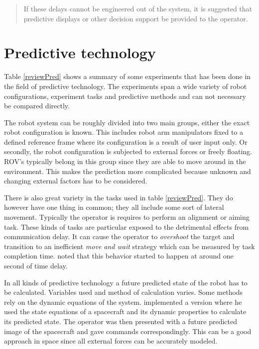 \begin{quote}
\small If these delays cannot be engineered out of the system, it is suggested that predictive displays or other decision support be provided to the operator.
\end{quote}


\section{Predictive technology}



Table \ref{reviewPred} shows a summary of some experiments that has been done in the field of predictive technology. The experiments span a wide variety of robot configurations, experiment tasks and predictive methods and can not necessary be compared directly.


The robot system can be roughly divided into two main groups, either the exact robot configuration is known. This includes robot arm manipulators fixed to a defined reference frame where its configuration is a result of user input only. Or secondly, the robot configuration is subjected to external forces or freely floating. ROV's typically belong in this group since they are able to move around in the environment. This makes the prediction more complicated because unknown and changing external factors has to be considered.

There is also great variety in the tasks used in table \ref{reviewPred}. They do however have one thing in common; they all include some sort of lateral movement. Typically the operator is requires to perform an alignment or aiming task. These kinds of tasks are particular exposed to the detrimental effects from communication delay. It can cause the operator to \emph{overshoot} the target and transition to an inefficient \emph{move and wait} strategy which can be measured by task completion time. \citet{Lane2002} noted that this behavior started to happen at around one second of time delay.

In all kinds of predictive technology a future predicted state of the robot has to be calculated. Variables used and method of calculation varies. Some methods rely on the dynamic equations of the system. \citet{Zhang2017} implemented a version where he used the state equations of a spacecraft and its dynamic properties to calculate its predicted state. The operator was then presented with a future predicted image of the spacecraft and gave commands correspondingly. This can be a good approach in space since all external forces can be accurately modeled.

